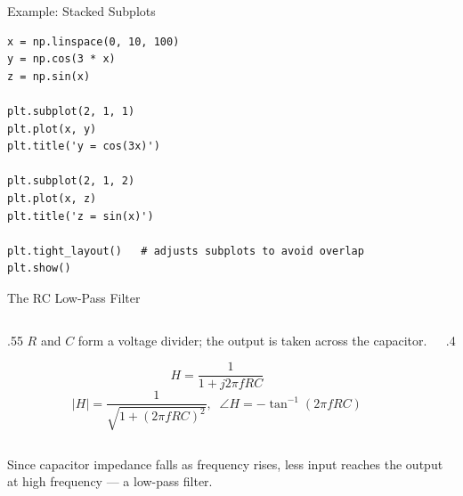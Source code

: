 \documentclass[9pt,aspectratio=169,xcolor=table]{beamer}
\begin{document}
\begin{frame}[fragile]{Example: Stacked Subplots}
    \leavevmode
\begin{lstlisting}
x = np.linspace(0, 10, 100)
y = np.cos(3 * x)
z = np.sin(x)

plt.subplot(2, 1, 1)
plt.plot(x, y)
plt.title('y = cos(3x)')

plt.subplot(2, 1, 2)
plt.plot(x, z)
plt.title('z = sin(x)')

plt.tight_layout()   # adjusts subplots to avoid overlap
plt.show()
\end{lstlisting}
\end{frame}

\begin{frame}{The RC Low-Pass Filter}
    \leavevmode
    \begin{columns}[t]
        \begin{column}{.55\textwidth}
            $R$ and $C$ form a voltage divider; the output is taken
            across the capacitor.

            \vspace{2mm}
            \[
            H = \frac{1}{1 + j 2\pi f RC}
            \]
            \[
            |H| = \frac{1}{\sqrt{1+(2\pi fRC)^2}}, \;\; \angle H = -\tan^{-1}(2\pi fRC)
            \]
        \end{column}
        \begin{column}{.4\textwidth}
            \begin{center}
            \end{center}
        \end{column}
    \end{columns}

    \vspace{2mm}
    {\small Since capacitor impedance falls as frequency rises, less
    input reaches the output at high frequency --- a \alert{low-pass}
    filter.}
\end{frame}
\end{document}
